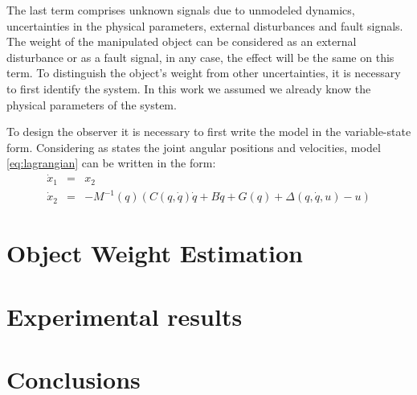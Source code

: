 \documentclass[a4paper, 10pt]{article}
\begin{document}
The last term comprises unknown signals due to unmodeled dynamics, uncertainties in the physical parameters, external disturbances and fault signals. The weight of the manipulated object can be considered as an external disturbance or as a fault signal, in any case, the effect will be the same on this term. To distinguish the object's weight from other uncertainties, it is necessary to first identify the system. In this work we assumed we already know the physical parameters of the system.

To design the observer it is necessary to first write the model in the variable-state form. Considering as states the joint angular positions and velocities, model \ref{eq:lagrangian} can be written in the form:
  \begin{eqnarray}
    \dot{x}_1 &=& x_2\label{eq:model1}\\
    \dot{x}_2 &=& -M^{-1}(q)\left(C(q, \dot{q})\dot{q} + B\dot{q} + G(q) + \Delta(q,\dot{q},u) - u\right)\label{eq:model2}
  \end{eqnarray}
\section{Object Weight Estimation}

\section{Experimental results}

\section{Conclusions}
\end{document}
